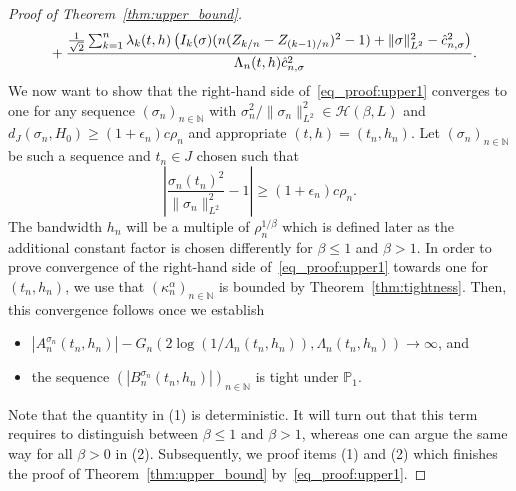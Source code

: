 \documentclass[10.5pt,letter]{article}
\numberwithin{equation}{section}
\theoremstyle{definition}
\newcommand{\N}{\mathbb{N}}
\renewcommand{\P}{\mathbb{P}}
\newcommand{\1}{\mathbbm{1}}
\begin{document}
\begin{proof}[Proof of Theorem~\ref{thm:upper_bound}]
\begin{align*}
    &\hspace{0.5cm} + \frac{\frac{1}{\sqrt{2}}\sum_{k=1}^n \lambda_k(t,h) \left(I_k(\sigma)(n(Z_{k/n}-Z_{(k-1)/n})^2-1)+ \|\sigma\|_{L^2}^2 - \hat{c}_{n,\sigma}^2\right)}{\Lambda_n(t,h) \hat{c}_{n,\sigma}^2}. 
\end{align*}
We now want to show that the right-hand side of~\eqref{eq_proof:upper1} converges to one for any sequence $(\sigma_n)_{n\in\N}$ with $\sigma_n^2/\|\sigma_n\|_{L^2}^2\in\mathcal{H}(\beta,L)$ and $d_J(\sigma_n,H_0)\geq (1+\epsilon_n)c\rho_n$ and appropriate $(t,h)=(t_n,h_n)$. Let $(\sigma_n)_{n\in\N}$ be such a sequence and $t_n\in J$ chosen such that 
 \[ \left|\frac{\sigma_
 n(t_n)^2}{\|\sigma_n\|_{L^2}^2} -1\right| \geq (1+\epsilon_n)c\rho_n. \]
The bandwidth $h_n$ will be a multiple of $\rho_n^{1/\beta}$ which is defined later as the additional constant factor is chosen differently for $\beta\leq 1$ and $\beta>1$.
In order to prove convergence of the right-hand side of~\eqref{eq_proof:upper1} towards one for $(t_n,h_n)$, we use that $(\kappa_n^\alpha)_{n\in\N}$ is bounded by Theorem~\ref{thm:tightness}. Then, this convergence follows once we establish
\begin{itemize}
    \item[(1)] $|A_n^{\sigma_n}(t_n,h_n)|-G_n(2\log(1/\Lambda_n(t_n,h_n)),\Lambda_n(t_n,h_n)) \rightarrow \infty$, and
    \item[(2)] the sequence $(|B_n^{\sigma_n}(t_n,h_n)|)_{n\in\N}$  is tight under $\P_1$.
\end{itemize}
Note that the quantity in (1) is deterministic. It will turn out that this term requires to distinguish between $\beta\leq 1$ and $\beta>1$, whereas one can argue the same way for all $\beta>0$ in (2). Subsequently, we proof items (1) and (2) which finishes the proof of Theorem~\ref{thm:upper_bound} by~\eqref{eq_proof:upper1}. \smallskip


\end{proof}
\end{document}
